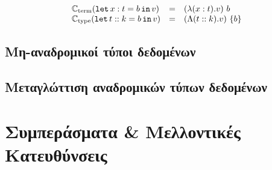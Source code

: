 \documentclass[diploma]{softlab-thesis}
\begin{document}
  \begin{displaymath}
    \begin{array}{lll}
    \mathbb{C}_{\mathrm{term}}(\operatorname{\texttt{let}} x : t = b \operatorname{\texttt{in}} v) &=& (\lambda (x : t) . v)\ b\\
    \mathbb{C}_{\mathrm{type}}(\operatorname{\texttt{let}} t :: k = b \operatorname{\texttt{in}} v) &=& (\Lambda (t :: k) . v)\ \{b\}
    \end{array}
    \end{displaymath}
 

\section{Μη-αναδρομικοί τύποι δεδομένων}
\label{sec:non-recursive-data}




\section{Μεταγλώττιση αναδρομικών τύπων δεδομένων}
\label{sec:compile-recursive-datatypes}




\chapter{Συμπεράσματα \& Μελλοντικές Κατευθύνσεις}
\label{chap:chapter6}




   




\nocite{*}

%




\end{document}
